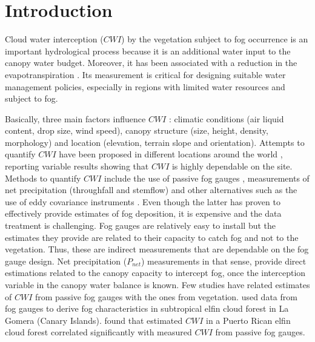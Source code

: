\documentclass[a4paper,12pt]{article}
\begin{document}
\section{Introduction}
Cloud water interception ($CWI$) by the vegetation subject to fog occurrence is an important hydrological process because it is an additional water input to the canopy water budget. Moreover, it has been associated with a reduction in the evapotranspiration \citep{Bruijnzeel2001, Ritteretal2008}. Its measurement is critical for designing suitable water management policies, especially in regions with limited water resources and subject to fog. 

Basically, three main factors influence $CWI$ \citep{Villegasetal2008, Ritteretal2008, Braumanetal2010}: climatic conditions (air liquid content, drop size, wind speed), canopy structure (size, height, density, morphology) and location (elevation, terrain slope and orientation). Attempts to quantify $CWI$ have been proposed in different locations around the world \citep{Ingrahametal1988, CavalierandGoldstein1989, Hamiltonetal1995, Holder2004, McJannetetal2007a, Gabrieletal2008, GomezPeraltaetal2008, Ritteretal2008, Villegasetal2008, Holwerdaetal2010, Ueharaetal2012, Pryetetal2012a}, reporting variable results showing that $CWI$ is highly dependable on the site. Methods to quantify $CWI$ include the use of passive fog gauges \citep{Juvik1978, Ingrahametal1988, Aboaletal2000, Villegasetal2008, Frumauetal2011}, measurements of net precipitation (throughfall and stemflow) \citep{Holder2003, Gabrieletal2008, Pradaetal2009, Pryetetal2012a} and other alternatives such as the use of eddy covariance instruments \citep{Changetal2002, Holwerdaetal2006, Eugsteretal2006}. Even though the latter has proven to effectively provide estimates of fog deposition, it is expensive and the data treatment is challenging. Fog gauges are relatively easy to install but the estimates they provide are related to their capacity to catch fog and not to the vegetation. Thus, these are indirect measurements that are dependable on the fog gauge design. Net precipitation ($P_{net}$) measurements in that sense, provide direct estimations related to the canopy capacity to intercept fog, once the interception variable in the canopy water balance is known. Few studies have related estimates of $CWI$ from passive fog gauges with the ones from vegetation. \cite{Ritteretal2008} used data from fog gauges to derive fog characteristics in subtropical elfin cloud forest in La Gomera (Canary Islands). \cite{Holwerdaetal2011} found that estimated $CWI$ in a Puerto Rican elfin cloud forest correlated significantly with measured $CWI$ from passive fog gauges.
\end{document}
